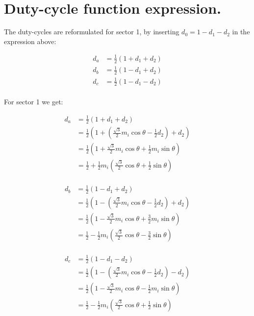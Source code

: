 \documentclass[]{book}
\begin{document}
\hypertarget{duty-cycle-function-expression.}{%
\section{Duty-cycle function expression.}\label{duty-cycle-function-expression.}}

The duty-cycles are reformulated for sector 1, by inserting \(d_0 = 1-d_1-d_2\) in the expression above:

\[
\begin{aligned}
d_a  &  = \frac{1}{2} (1+ d_1+d_2)\\
d_b  &  = \frac{1}{2} (1- d_1+d_2)\\
d_c  &  = \frac{1}{2} (1- d_1-d_2)\\
\end{aligned}
\]

For sector 1 we get:

\[
\begin{aligned}
d_a  &  = \frac{1}{2} (1+ d_1+d_2)\\
&  =  \frac{1}{2} (1+ (\frac{\sqrt{3}}{2} m_i   \cos\theta  - \frac{1}{2}d_2)+d_2) \\
&  =  \frac{1}{2} (1+ \frac{\sqrt{3}}{2} m_i   \cos\theta  + \frac{1}{2} m_i \sin\theta ) \\
&  =  \frac{1}{2} + \frac{1}{2} m_i( \frac{\sqrt{3}}{2}  \cos\theta  + \frac{1}{2} \sin\theta ) \\
\end{aligned}
\]

\[
\begin{aligned}
d_b  &  = \frac{1}{2} (1- d_1+d_2)\\
&  =  \frac{1}{2} (1- (\frac{\sqrt{3}}{2} m_i   \cos\theta  - \frac{1}{2}d_2)+d_2) \\
&  =  \frac{1}{2} (1- \frac{\sqrt{3}}{2} m_i   \cos\theta  + \frac{3}{2} m_i \sin\theta ) \\
&  =  \frac{1}{2} - \frac{1}{2} m_i( \frac{\sqrt{3}}{2}  \cos\theta  - \frac{3}{2} \sin\theta ) \\
\end{aligned}
\]

\[
\begin{aligned}
d_c  &  = \frac{1}{2} (1- d_1-d_2)\\
&  =  \frac{1}{2} (1- (\frac{\sqrt{3}}{2} m_i   \cos\theta  - \frac{1}{2}d_2)-d_2) \\
&  =  \frac{1}{2} (1- \frac{\sqrt{3}}{2} m_i   \cos\theta  - \frac{1}{2} m_i \sin\theta ) \\
&  =  \frac{1}{2} - \frac{1}{2} m_i( \frac{\sqrt{3}}{2}  \cos\theta  + \frac{1}{2} \sin\theta ) \\
\end{aligned}
\]
\end{document}
